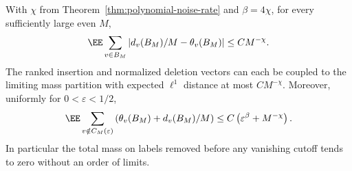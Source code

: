 \documentclass[11pt,letterpaper]{article}
\begin{document}
\begin{corollary}
\label{cor:basin-rate}
With $\chi$ from Theorem~\ref{thm:polynomial-noise-rate} and
$\beta=4\chi$, for every sufficiently large even $M$,
\begin{equation}\label{eq:deletion-basin-rate}
 \EE\sum_{v\in B_M}|d_v(B_M)/M-\theta_v(B_M)|\le C M^{-\chi}.
\end{equation}
The ranked insertion and normalized deletion vectors can each be
coupled to the limiting mass partition with expected $\ell^1$
distance at most $C M^{-\chi}$. Moreover, uniformly for
$0<\varepsilon<1/2$,
\begin{equation}\label{eq:finite-early-mass}
 \EE\sum_{v\notin C_M(\varepsilon)}
       \left(\theta_v(B_M)+d_v(B_M)/M\right)
       \le C\left(\varepsilon^\beta+M^{-\chi}\right).
\end{equation}
In particular the total mass on labels removed before any vanishing
cutoff tends to zero without an order of limits.
\end{corollary}
\end{document}

